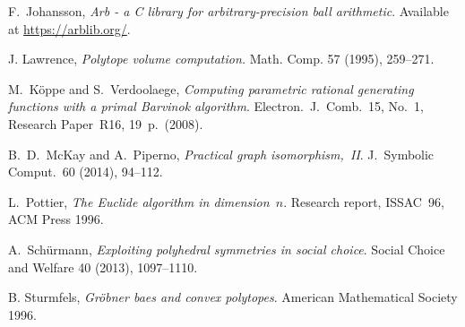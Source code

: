\documentclass[12pt,a4paper]{scrartcl}
\theoremstyle{definition}
\begin{document}
\begin{thebibliography}{15.}
F.~Johansson,
\emph{Arb - a C library for arbitrary-precision ball arithmetic}.
Available at \url{https://arblib.org/}.

 J. Lawrence, \emph{Polytope volume computation.} Math. Comp. 57 (1995), 259--271.

M.~K\"oppe and S.~Verdoolaege,
\emph{Computing parametric rational generating functions with a primal Barvinok algorithm}.
Electron.\ J.\ Comb.\ 15, No.\ 1, Research Paper~R16, 19~p.\ (2008).

B.~D.~McKay and A.~Piperno,
\emph{Practical graph isomorphism,~II}.
J.\ Symbolic Comput.\ 60 (2014), 94--112.

L.~Pottier,
\emph{The Euclide algorithm in dimension~$n$}.
Research report, ISSAC~96, ACM Press 1996.

A.~Sch\"urmann,
\emph{Exploiting polyhedral symmetries in social choice}.
Social Choice and Welfare 40 (2013), 1097--1110.

B. Sturmfels,
\emph{Gröbner baes and convex polytopes}.
American Mathematical Society 1996.
\end{thebibliography}
\end{document}

